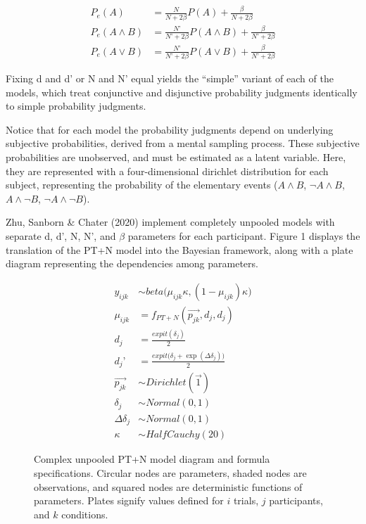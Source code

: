 \documentclass[
  english,
  man,floatsintext]{apa6}
\begin{document}
\begin{align*}
  P_{e}(A) &= \frac{N}{N + 2 \beta}P(A) + \frac{\beta}{N+2 \beta} \\
  P_{e}(A \land B) &= \frac{N’}{N’ + 2 \beta}P(A \land B) + \frac{\beta}{N’+2 \beta} \\
  P_{e}(A \lor B) &= \frac{N’}{N’ + 2 \beta}P(A \lor B) + \frac{\beta}{N’+2 \beta} 
\end{align*}

Fixing d and d' or N and N' equal yields the ``simple'' variant of each of the models, which treat conjunctive and disjunctive probability judgments identically to simple probability judgments.

Notice that for each model the probability judgments depend on underlying subjective probabilities, derived from a mental sampling process. These subjective probabilities are unobserved, and must be estimated as a latent variable. Here, they are represented with a four-dimensional dirichlet distribution for each subject, representing the probability of the elementary events (\(A \land B\), \(\neg A \land B\), \(A \land \neg B\), \(\neg A \land \neg B\)).

Zhu, Sanborn \& Chater (2020) implement completely unpooled models with separate d, d', N, N', and \(\beta\) parameters for each participant. Figure 1 displays the translation of the PT+N model into the Bayesian framework, along with a plate diagram representing the dependencies among parameters.

\begin{figure}
  \begin{minipage}{.5\textwidth}
    \flushright
    
  \end{minipage}%
  \begin{minipage}{.5\textwidth}
    \flushleft
    \small
    \begin{align*}
      y_{ijk} &\sim beta\big(\mu_{ijk} \kappa, (1-\mu_{ijk}) \kappa \big) \\
      \mu_{ijk} &= f_{PT+N}(\overrightarrow{p_{jk}}, d_j, d_j)  \\
      d_j &= \frac{expit(\delta_j)}{2} \\
      d_j’ &= \frac{expit\big(\delta_j + \exp(\Delta\delta_j)\big)}{2} \\
      \overrightarrow{p_{jk}} &\sim Dirichlet(\overrightarrow{1}) \\
      \delta_j &\sim Normal(0,1) \\
      \Delta\delta_j &\sim Normal(0,1) \\
      \kappa &\sim HalfCauchy(20)
    \end{align*}
  \end{minipage}
  \caption{Complex unpooled PT+N model diagram and formula specifications. Circular nodes are parameters, shaded nodes are observations, and squared nodes are deterministic functions of parameters. Plates signify values defined for $i$ trials, $j$ participants, and $k$ conditions.}
\end{figure}
\end{document}
